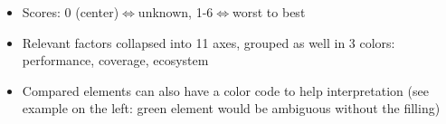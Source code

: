 \documentclass[hyperref={pdfpagelabels=false}]{beamer}
\begin{document}
\begin{frame}
\begin{columns}[t]
\begin{tikzpicture}
         \end{tikzpicture}
         
         
         \begin{itemize}[<.->]
         \item \scriptsize{Scores: 0 (center)$\Leftrightarrow$unknown, 1-6$\Leftrightarrow$worst to best}
         \item \scriptsize{Relevant factors collapsed into 11 axes, grouped as well in 3 colors: \textcolor{visiblered}{performance}, \textcolor{visiblegreen}{coverage}, \textcolor{visibleblue}{ecosystem}}
         \item \scriptsize{Compared elements can also have a color code to help interpretation (see example on the left: green element would be ambiguous without the filling)}
         \end{itemize}

       \end{columns}
     \end{frame}

    

     
     
         
\end{document}
